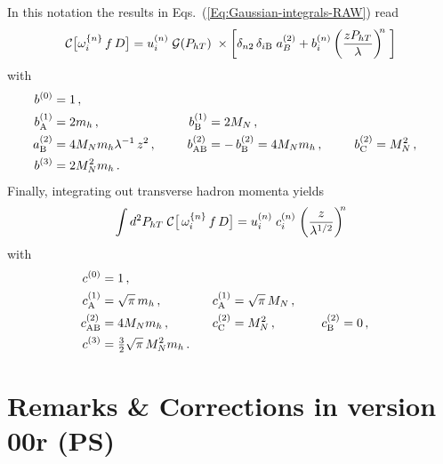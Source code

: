 \documentclass[a4paper,11pt]{article}
\newcommand{\be}{\begin{equation}}
\newcommand{\ee}{\end{equation}}
\def\Phperp{P_{hT}}
\newcommand*{\BibPath}{.}%
\begin{document}
In this notation the results in Eqs.~(\ref{Eq:Gaussian-integrals-RAW}) 
read 
\be
	{\cal C}\bigl[ \omega^{\{n\}}_{i} \, f \, D \bigr]
	= u^{(n)}_{i} \;{\cal G}(\Phperp)\;\times
	\left[
	\delta_{n2}\,\delta_{i\rm B}\;a^{(2)}_{B} + b^{(n)}_{i} 
	\left(\frac{z\Phperp}{\lambda}\right)^{\!\!n}\;\right]
\ee
with
\begin{alignat}{7}
	b^{(0)}_{\rm  } 	&= 1 \, , \\
	b^{(1)}_{\rm A} 	&= 2m_h	\, , &
	b^{(1)}_{\rm B} 	&= 2M_N	\, , \\
	a^{(2)}_{\rm B}	&= 4M_Nm_h\lambda^{-1}\,z^2  \, , \;\;\;\;\;\; & 
	b^{(2)}_{\rm AB} 	&= -\,b^{(2)}_{\rm B}
			 = 4M_Nm_h 	\, , \;\;\;\;\;\; & 
	b^{(2)}_{\rm C} 	&= M_N^2  \, ,\\
	b^{(3)}_{\rm  } 	&= 2M_N^2m_h \, .
	\label{Eq:Gaussian-integrals-working-III}
\end{alignat}
Finally, integrating out transverse hadron momenta yields
\be
	\int d^2\Phperp\;
	{\cal C}\bigl[\,\omega^{\{n\}}_{i} \, f \, D \bigr] 
	= u^{(n)}_{i} \;c^{(n)}_{i}\;\biggl(\frac{z}{\lambda^{1/2}}\biggr)^{\!\!n}
\ee
with
\begin{alignat}{7}
	c^{(0)}_{\rm  } 	&= 1 \, , \\
	c^{(1)}_{\rm A} 	&= \sqrt{\pi}\,m_h	\, , &
	c^{(1)}_{\rm A} 	&= \sqrt{\pi}\,M_N	\, , \\
	c^{(2)}_{\rm AB} 	&= 4M_Nm_h		\, , \;\;\;\;\;\; & 
	c^{(2)}_{\rm C} 	&= M_N^2 		\, , \;\;\;\;\;\;\;\;\;\; & 
	c^{(2)}_{\rm B}	&= 0 			\, ,\\
	c^{(3)}_{\rm  } 	&= {\textstyle\frac32}\sqrt{\pi} \,M_N^2m_h 
	\, . \;\;\;     &
			&
	\label{Eq:Gaussian-integrals-working-III}
\end{alignat}

 

\newpage
\section*{Remarks  \& Corrections in version 00r (PS) {}}
\end{document}
